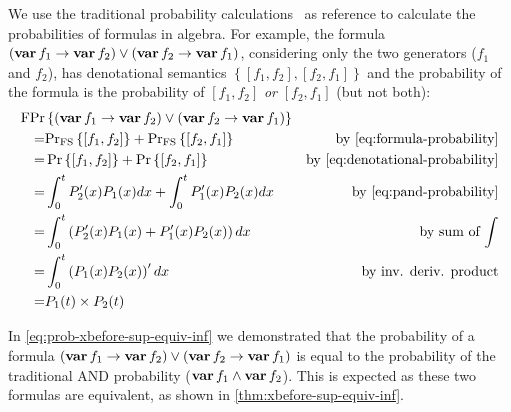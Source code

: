 We use the traditional probability calculations~\cite{Merle2010} as reference to calculate the probabilities of formulas in \ac{algebra}.
%
For example, the formula $\left(\operatorname{\mathbf{var}} f_1 \rightarrow \operatorname{\mathbf{var}} f_2\right) \lor \left(\operatorname{\mathbf{var}} f_2 \rightarrow \operatorname{\mathbf{var}} f_1\right)$, considering only the two generators ($f_1$ and $f_2$), has denotational semantics $\left\{\left[f_1, f_2\right], \left[f_2, f_1\right]\right\}$ and the probability of the formula is the probability of $\left[f_1, f_2\right]$ \emph{or} $\left[f_2, f_1\right]$ (but not both):
%
\begin{align}
\formulaprobop&\left\{\left(\xbefore{\var{f_1}}{\var{f_2}}\right) \lor \left(\xbefore{\var{f_2}}{\var{f_1}}\right)\right\}\nonumber\\
=&\denotationalprob{\left[f_1,f_2\right]} + \denotationalprob{\left[f_2,f_1\right]} & \text{by \cref{eq:formula-probability}} \nonumber\\
= &\probability{\left[f_1,f_2\right]} + \probability{\left[f_2,f_1\right]} & \text{by \cref{eq:denotational-probability}}\nonumber\\
=&\int_0^t P'_2(x) P_1(x) dx + \int_0^t P'_1(x) P_2(x) dx & \text{by \cref{eq:pand-probability}} \nonumber\\
= & \int_0^t \left(P'_2(x) P_1(x) + P'_1(x) P_2(x)\right) dx & \text{by sum of $\int$} \nonumber\\
= & \int_0^t \left(P_1(x) P_2(x)\right)' dx & \text{by inv. deriv. product} \nonumber\\
= & P_1(t) \times P_2(t)\label{eq:prob-xbefore-sup-equiv-inf}
\end{align}

In \cref{eq:prob-xbefore-sup-equiv-inf} we demonstrated that the probability of a formula $\left(\operatorname{\mathbf{var}} f_1 \rightarrow \operatorname{\mathbf{var}} f_2\right) \lor \left(\operatorname{\mathbf{var}} f_2 \rightarrow \operatorname{\mathbf{var}} f_1\right)$ is equal to the probability of the traditional \ac{AND} probability ($\operatorname{\mathbf{var}} f_1 \land \operatorname{\mathbf{var}} f_2$).
This is expected as these two formulas are equivalent, as shown in \cref{thm:xbefore-sup-equiv-inf}.

